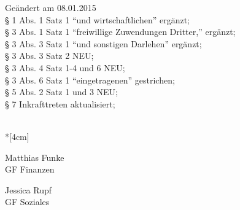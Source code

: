 Geändert am 08.01.2015 \\
§ 1 Abs. 1 Satz 1 "`und wirtschaftlichen"' ergänzt;\\
§ 3 Abs. 1 Satz 1 "`freiwillige Zuwendungen Dritter,"' ergänzt;\\
§ 3 Abs. 3 Satz 1 "`und sonstigen Darlehen"' ergänzt;\\
§ 3 Abs. 3 Satz 2 NEU;\\
§ 3 Abs. 4 Satz 1-4 und 6 NEU;\\
§ 3 Abs. 6 Satz 1 "`eingetragenen"' gestrichen;\\
§ 5 Abs. 2 Satz 1 und 3 NEU;\\
§ 7 Inkrafttreten aktualisiert;


\normalsize
~\\*[4cm]
\begin{center}
\hspace*{\fill}
\parbox{7cm}{Matthias Funke\\GF Finanzen}
\hfill\parbox{7cm}{Jessica Rupf\\GF Soziales}
\hspace*{\fill}
\end{center}